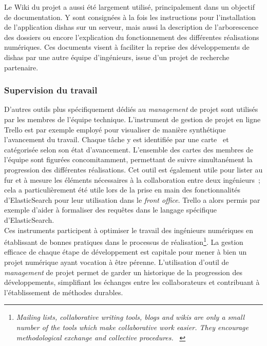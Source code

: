\documentclass[a4paper,12pt,twoside]{book}
\newcommand{\eng}{\emph}
\newcommand{\fo}{\eng{front office}\xspace}
\newcommand{\g}[1]{\og#1~\fg}
\newcommand{\dishas}{\gls{dishas}\xspace}
\begin{document}
Le Wiki du projet a aussi été largement utilisé, principalement dans un objectif de documentation. Y sont consignées à la fois les instructions pour l'installation de l'application \dishas sur un serveur, mais aussi la description de l'arborescence des dossiers ou encore l'explication du fonctionnement des différentes réalisations numériques. Ces documents visent à faciliter la reprise des développements de \dishas par une autre équipe d'ingénieurs, issue d'un projet de recherche partenaire.

			\subsubsection{Supervision du travail}
D'autres outils plus spécifiquement dédiés au \eng{management} de projet sont utilisés par les membres de l'équipe technique. L'instrument de gestion de projet en ligne Trello est par exemple employé pour visualiser de manière synthétique l'avancement du travail. Chaque tâche y est identifiée par une \g{carte} et catégorisée selon son état d'avancement. L'ensemble des cartes des membres de l'équipe sont figurées concomitamment, permettant de suivre simultanément la progression des différentes réalisations. Cet outil est également utile pour lister au fur et à mesure les éléments nécessaires à la collaboration entre deux ingénieurs~; cela a particulièrement été utile lors de la prise en main des fonctionnalités d'ElasticSearch pour leur utilisation dans le \fo. Trello a alors permis par exemple d'aider à formaliser des requêtes dans le langage spécifique d'ElasticSearch.\\

Ces instruments participent à optimiser le travail des ingénieurs numériques en établissant de bonnes pratiques dans le processus de réalisation\footnote{\g{\eng{Mailing lists, collaborative writing tools, blogs and wikis are only a small number of the tools which make collaborative work easier. They encourage methodological exchange and collective procedures.}} \cite[§~32]{heimburgerHasHistorianCraft2012}}. La gestion efficace de chaque étape de développement est capitale pour mener à bien un projet numérique ayant vocation à être pérenne. L'utilisation d'outil de \eng{management} de projet permet de garder un historique de la progression des développements, simplifiant les échanges entre les collaborateurs et contribuant à l'établissement de méthodes durables.
\end{document}
